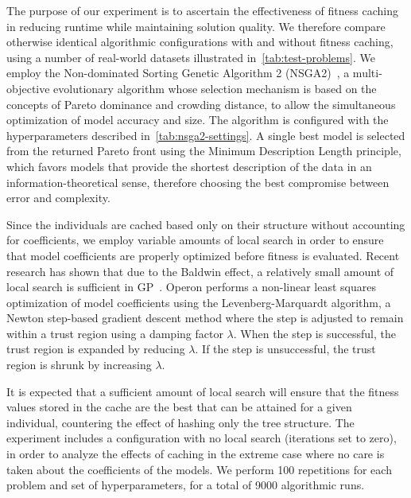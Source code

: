 \documentclass[openacc]{rstransa}%
\begin{document}
The purpose of our experiment is to ascertain the effectiveness of fitness caching in reducing runtime while maintaining solution quality. We therefore compare otherwise identical algorithmic configurations with and without fitness caching, using a number of real-world datasets illustrated in~\autoref{tab:test-problems}.
%
We employ the Non-dominated Sorting Genetic Algorithm 2 (NSGA2)~\cite{deb2002}, a multi-objective evolutionary algorithm whose selection mechanism is based on the concepts of Pareto dominance and crowding distance, to allow the simultaneous optimization of model accuracy and size.
%
The algorithm is configured with the hyperparameters described in~\autoref{tab:nsga2-settings}. A single best model is selected from the returned Pareto front using the Minimum Description Length principle, which favors models that provide the shortest description of the data in an information-theoretical sense\cite{grunwald2019}, therefore choosing the best compromise between error and complexity.

Since the individuals are cached based only on their structure without accounting for coefficients, we employ variable amounts of local search in order to ensure that model coefficients are properly optimized before fitness is evaluated.
%
Recent research has shown that due to the Baldwin effect, a relatively small amount of local search is sufficient in GP~\cite{burlacu2024}. Operon performs a non-linear least squares optimization of model coefficients using the Levenberg-Marquardt algorithm\cite{gavin2019}, a Newton step-based gradient descent method where the step is adjusted to remain within a trust region using a damping factor $\lambda$. When the step is successful, the trust region is expanded by reducing $\lambda$. If the step is unsuccessful, the trust region is shrunk by increasing $\lambda$.

%
It is expected that a sufficient amount of local search will ensure that the fitness values stored in the cache are the best that can be attained for a given individual, countering the effect of hashing only the tree structure. The experiment includes a configuration with no local search (iterations set to zero), in order to analyze the effects of caching in the extreme case where no care is taken about the coefficients of the models.
%
We perform 100 repetitions for each problem and set of hyperparameters, for a total of 9000 algorithmic runs.
\end{document}
